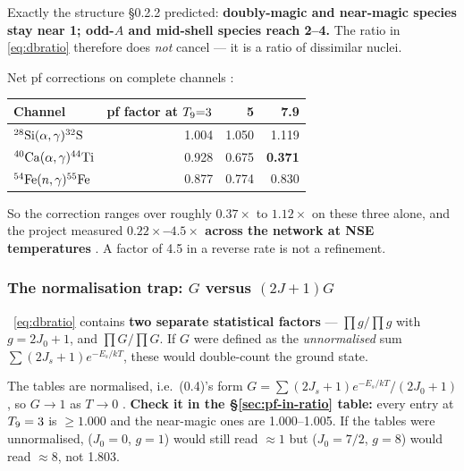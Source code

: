 Exactly the structure \S0.2.2 predicted: \textbf{doubly-magic and near-magic
species stay near 1; odd-$A$ and mid-shell species reach 2--4.} The ratio in
\eqref{eq:dbratio} therefore does \emph{not} cancel --- it is a ratio of
dissimilar nuclei.

Net pf corrections on complete channels \derivedhere{}:

\begin{center}
\begin{tabular}{@{}lrrr@{}}
\toprule
\textbf{Channel} & \textbf{pf factor at $\Tn{=}3$} & \textbf{5} & \textbf{7.9} \\
\midrule
$\nuc{Si}{28}(\alpha,\gamma)\nuc{S}{32}$  & 1.004 & 1.050 & 1.119 \\
$\nuc{Ca}{40}(\alpha,\gamma)\nuc{Ti}{44}$ & 0.928 & 0.675 & \textbf{0.371} \\
$\nuc{Fe}{54}(n,\gamma)\nuc{Fe}{55}$      & 0.877 & 0.774 & 0.830 \\
\bottomrule
\end{tabular}
\end{center}

So the correction ranges over roughly $0.37\times$ to $1.12\times$ on these
three alone, and the project measured
\textbf{$0.22\times$--$4.5\times$ across the network at NSE temperatures}
. A factor of 4.5 in a reverse rate is not a refinement.

\subsubsection{The normalisation trap: \texorpdfstring{$G$ versus $(2J+1)G$}{G versus (2J+1)G}}
\label{sec:pf-normalisation}

\begin{warn}
\warnglyph{}~\eqref{eq:dbratio} contains \textbf{two separate statistical
factors} --- $\prod g/\prod g$ with $g = 2J_0+1$, and $\prod G/\prod G$. If $G$
were defined as the \emph{unnormalised} sum $\sum(2J_s+1)e^{-E_s/kT}$, these
would double-count the ground state.
\end{warn}

The tables are normalised, i.e.\ (0.4)'s form
$G = \sum(2J_s+1)e^{-E_s/kT}/(2J_0+1)$, so $G \to 1$ as $T \to 0$
\citep{rauscher2000,rauscher2003}. \textbf{Check it in the
\S\ref{sec:pf-in-ratio} table:} every entry at $\Tn = 3$ is $\ge 1.000$ and the
near-magic ones are 1.000--1.005. If the tables were unnormalised, 
($J_0 = 0$, $g = 1$) would still read ${\approx}1$ but 
($J_0 = 7/2$, $g = 8$) would read ${\approx}8$, not 1.803. \derivedhere

